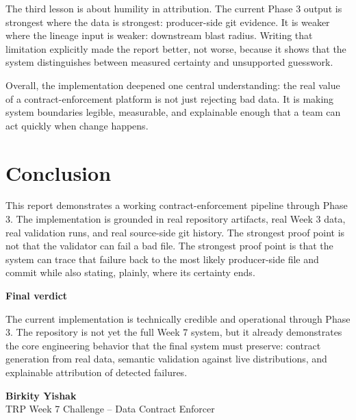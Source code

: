 \documentclass[11pt]{report}
\begin{document}
The third lesson is about humility in attribution. The current Phase 3 output is strongest where the data is strongest: producer-side git evidence. It is weaker where the lineage input is weaker: downstream blast radius. Writing that limitation explicitly made the report better, not worse, because it shows that the system distinguishes between measured certainty and unsupported guesswork.

Overall, the implementation deepened one central understanding: the real value of a contract-enforcement platform is not just rejecting bad data. It is making system boundaries legible, measurable, and explainable enough that a team can act quickly when change happens.

\clearpage
\chapter{Conclusion}

This report demonstrates a working contract-enforcement pipeline through Phase 3. The implementation is grounded in real repository artifacts, real Week 3 data, real validation runs, and real source-side git history. The strongest proof point is not that the validator can fail a bad file. The strongest proof point is that the system can trace that failure back to the most likely producer-side file and commit while also stating, plainly, where its certainty ends.

\begin{callout}
\textbf{Final verdict}

The current implementation is technically credible and operational through Phase 3. The repository is not yet the full Week 7 system, but it already demonstrates the core engineering behavior that the final system must preserve: contract generation from real data, semantic validation against live distributions, and explainable attribution of detected failures.
\end{callout}

\vfill
\begin{center}
{\large\bfseries\color{navy} Birkity Yishak}\\
\textcolor{slate}{TRP Week 7 Challenge -- Data Contract Enforcer}
\end{center}
\end{document}
